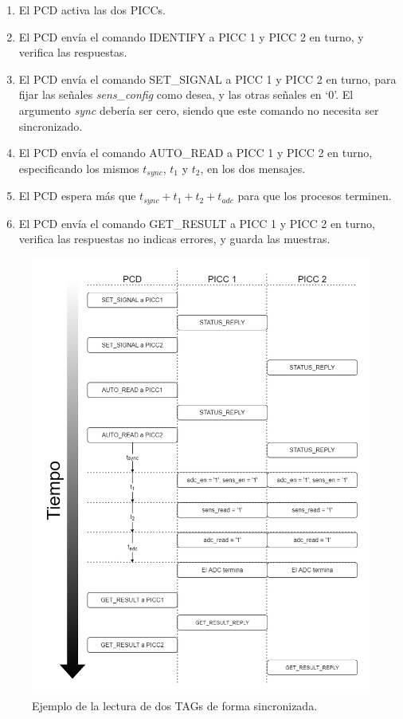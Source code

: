 \documentclass[a4paper, twoside, 11pt]{report}
\begin{document}
\begin{enumerate}
  \item El PCD activa las dos PICCs.
  \item El PCD envía el comando IDENTIFY a PICC 1 y PICC 2 en turno, y verifica las respuestas.
  \item El PCD envía el comando SET\_SIGNAL a PICC 1 y PICC 2 en turno, para fijar las señales \textit{sens\_config} como desea, y las otras señales en ‘0’. El argumento \textit{sync} debería ser cero, siendo que este comando no necesita ser sincronizado.
  \item El PCD envía el comando AUTO\_READ a PICC 1 y PICC 2 en turno, especificando los mismos  $t_{sync}$, $t_1$ y $t_2$, en los dos mensajes.
  \item El PCD espera más que $t_{sync} + t_1 + t_2 + t_{adc}$ para que los procesos terminen.
  \item El PCD envía el comando GET\_RESULT a PICC 1 y PICC 2 en turno, verifica las respuestas no indicas errores, y guarda las muestras.
\end{enumerate}

\begin{figure}[htb]
  \centering
  \includegraphics[width=1.0\textwidth]{./img/app_flow2.drawio}
  \caption{Ejemplo de la lectura de dos TAGs de forma sincronizada.}
  \label{fig:app_flow}
\end{figure}
\end{document}
